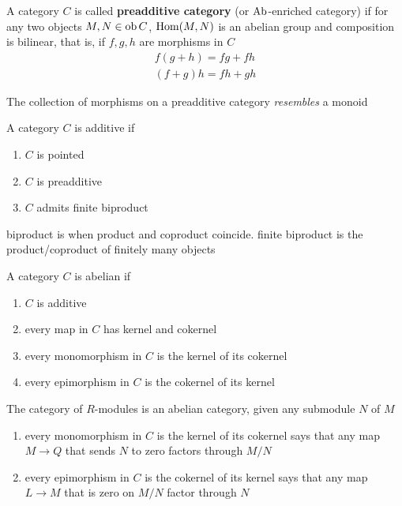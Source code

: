 \begin{definition}
	A category $C$ is called \textbf{preadditive category} (or $\operatorname{Ab}$-enriched category) if for any two objects $M, N \in \operatorname{ob} C$, $\operatorname{Hom}(M, N)$ is an abelian group and composition is bilinear, that is, if $f, g, h$ are morphisms in $C$
	\begin{align*}
		f (g + h) = fg + fh \\
		(f + g) h = fh + gh
	\end{align*}
	
	The collection of morphisms on a preadditive category \textit{resembles} a monoid
\end{definition}

\begin{definition}
	A category $C$ is additive if
	\begin{enumerate}
		\item $C$ is pointed
		\item $C$ is preadditive
		\item $C$ admits finite biproduct
	\end{enumerate}
	biproduct is when product and coproduct coincide. finite biproduct is the product/coproduct of finitely many objects
\end{definition}

\begin{definition}
	A category $C$ is abelian if
	\begin{enumerate}
		\item $C$ is additive
		\item every map in $C$ has kernel and cokernel
		\item every monomorphism in $C$ is the kernel of its cokernel
		\item every epimorphism in $C$ is the cokernel of its kernel
	\end{enumerate}
\end{definition}

\begin{remark}
	The category of $R$-modules is an abelian category, given any submodule $N$ of $M$
	\begin{enumerate}
		\item every monomorphism in $C$ is the kernel of its cokernel says that any map $M \to Q$ that sends $N$ to zero factors through $M / N$
		\item every epimorphism in $C$ is the cokernel of its kernel says that any map $L \to M$ that is zero on $M / N$ factor through $N$
	\end{enumerate}
\end{remark}

